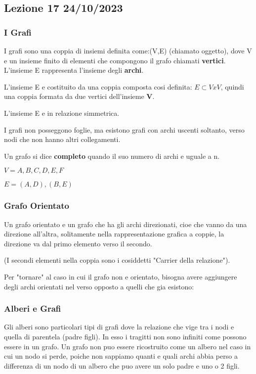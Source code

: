 \subsection{Lezione 17 24/10/2023}

\subsubsection{I Grafi}
I grafi sono una coppia di insiemi definita come:(V,E) (chiamato oggetto), dove V e un insieme finito di elementi che compongono il grafo chiamati \textbf{vertici}. L'insieme E rappresenta l'insieme degli \textbf{archi}.

L'insieme E e costituito da una coppia composta cosi definita: $E \subset V x V$, quindi una coppia formata da due vertici dell'insieme \textbf{V}.

L'insieme E e in relazione simmetrica. 

I  grafi non posseggono foglie, ma esistono grafi con archi uscenti soltanto, verso nodi che non hanno altri collegamenti.

Un grafo si dice \textbf{completo} quando il suo numero di archi e uguale a n.


$V = {A,B,C,D,E,F}$

$E = {(A,D), (B,E)}$

\subsubsection{Grafo Orientato}
Un grafo orientato e un grafo che ha gli archi direzionati, cioe che vanno da una direzione all'altra, solitamente nella rappresentazione grafica a coppie, la direzione va dal primo elemento verso il secondo.

(I secondi elementi nella coppia sono i cosiddetti "Carrier della relazione").


Per "tornare" al caso in cui il grafo non e orientato, bisogna avere aggiungere degli archi orientati nel verso opposto a quelli che gia esistono:


\subsubsection{Alberi e Grafi}

Gli alberi sono particolari tipi di grafi dove la relazione che vige tra i nodi e quella di parentela (padre figli). In esso i tragitti non sono infiniti come possono essere in un grafo.
Un grafo non puo essere ricostruito come un albero nel caso in cui un nodo si perde, poiche non sappiamo quanti e quali archi abbia perso a differenza di un nodo di un albero che puo avere un solo padre e uno o 2 figli.

